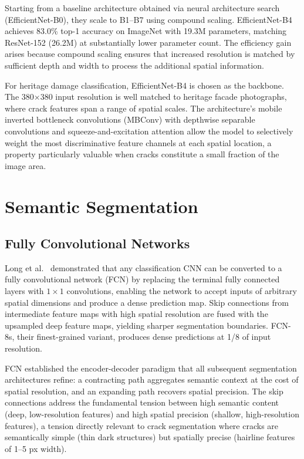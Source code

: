 \documentclass[12pt,a4paper]{article}
\begin{document}
Starting from a baseline architecture obtained via neural architecture search (EfficientNet-B0), they scale to B1--B7 using compound scaling. EfficientNet-B4 achieves 83.0\% top-1 accuracy on ImageNet with 19.3M parameters, matching ResNet-152 (26.2M) at substantially lower parameter count. The efficiency gain arises because compound scaling ensures that increased resolution is matched by sufficient depth and width to process the additional spatial information.

For heritage damage classification, EfficientNet-B4 is chosen as the backbone. The 380$\times$380 input resolution is well matched to heritage facade photographs, where crack features span a range of spatial scales. The architecture's mobile inverted bottleneck convolutions (MBConv) with depthwise separable convolutions and squeeze-and-excitation attention allow the model to selectively weight the most discriminative feature channels at each spatial location, a property particularly valuable when cracks constitute a small fraction of the image area.

\section{Semantic Segmentation}
\label{surv:sec:segmentation}

\subsection{Fully Convolutional Networks}

Long et al.~\cite{surv:long2015fully} demonstrated that any classification CNN can be converted to a fully convolutional network (FCN) by replacing the terminal fully connected layers with $1\times1$ convolutions, enabling the network to accept inputs of arbitrary spatial dimensions and produce a dense prediction map. Skip connections from intermediate feature maps with high spatial resolution are fused with the upsampled deep feature maps, yielding sharper segmentation boundaries. FCN-8s, their finest-grained variant, produces dense predictions at 1/8 of input resolution.

FCN established the encoder-decoder paradigm that all subsequent segmentation architectures refine: a contracting path aggregates semantic context at the cost of spatial resolution, and an expanding path recovers spatial precision. The skip connections address the fundamental tension between high semantic content (deep, low-resolution features) and high spatial precision (shallow, high-resolution features), a tension directly relevant to crack segmentation where cracks are semantically simple (thin dark structures) but spatially precise (hairline features of 1--5 px width).
\end{document}
